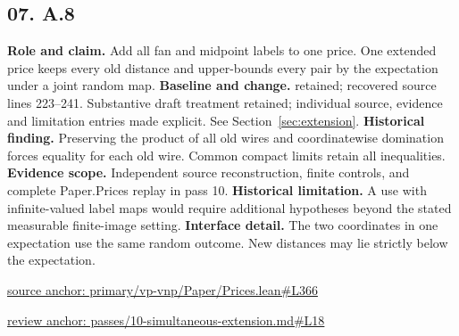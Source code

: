 \documentclass[11pt,letterpaper]{article}
\theoremstyle{definition}\newtheorem{definition}[theorem]{Definition}\newtheorem{example}[theorem]{Example}
\theoremstyle{remark}\newtheorem{remark}[theorem]{Remark}
\begin{document}
\subsection*{07. A.8}
\textbf{Role and claim.} Add all fan and midpoint labels to one price. One extended price keeps every old distance and upper-bounds every pair by the expectation under a joint random map.
\textbf{Baseline and change.} retained; recovered source lines 223--241. Substantive draft treatment retained; individual source, evidence and limitation entries made explicit. See Section~\ref{sec:extension}.
\textbf{Historical finding.} Preserving the product of all old wires and coordinatewise domination forces equality for each old wire. Common compact limits retain all inequalities.
\textbf{Evidence scope.} Independent source reconstruction, finite controls, and complete Paper.Prices replay in pass 10.
\textbf{Historical limitation.} A use with infinite-valued label maps would require additional hypotheses beyond the stated measurable finite-image setting.
\textbf{Interface detail.} The two coordinates in one expectation use the same random outcome. New distances may lie strictly below the expectation.
\par\href{https://github.com/nousentllc/VP-VNP-Review/blob/8a7976933b6b2b4ffda1ad3a0dfb5fc6b6f023e8/primary/vp-vnp/Paper/Prices.lean\#L366}{source anchor: primary/vp-vnp/Paper/Prices.lean\#L366}
\par\href{https://github.com/nousentllc/VP-VNP-Review/blob/8a7976933b6b2b4ffda1ad3a0dfb5fc6b6f023e8/passes/10-simultaneous-extension.md\#L18}{review anchor: passes/10-simultaneous-extension.md\#L18}
\goodbreak
\end{document}
